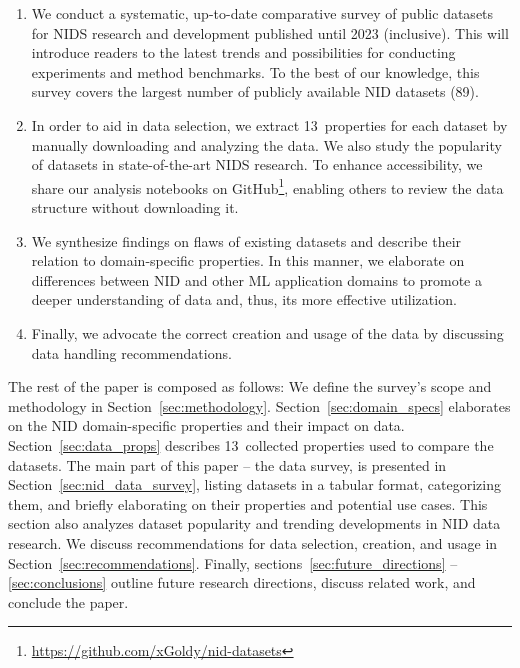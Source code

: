 \begin{enumerate}[itemsep=5pt, parsep=0pt]
    \item We conduct a systematic, up-to-date comparative survey of public datasets for NIDS research and development published until 2023 (inclusive). This will introduce readers to the latest trends and possibilities for conducting experiments and method benchmarks. To the best of our knowledge, this survey covers the largest number of publicly available NID datasets (89).

    \item In order to aid in data selection, we extract 13~properties for each dataset by manually downloading and analyzing the data. We also study the popularity of datasets in state-of-the-art NIDS research. To enhance accessibility, we share our analysis notebooks on GitHub\footnote{\url{https://github.com/xGoldy/nid-datasets}}, enabling others to review the data structure without downloading it.

    \item We synthesize findings on flaws of existing datasets and describe their relation to domain-specific properties. In this manner, we elaborate on differences between NID and other ML application domains to promote a deeper understanding of data and, thus, its more effective utilization.

    \item Finally, we advocate the correct creation and usage of the data by discussing data handling recommendations.
\end{enumerate}

The rest of the paper is composed as follows: We define the survey's scope and methodology in Section~\ref{sec:methodology}. Section~\ref{sec:domain_specs} elaborates on the NID domain-specific properties and their impact on data. Section~\ref{sec:data_props} describes 13~collected properties used to compare the datasets. The main part of this paper -- the data survey, is presented in Section~\ref{sec:nid_data_survey}, listing datasets in a tabular format, categorizing them, and briefly elaborating on their properties and potential use cases. This section also analyzes dataset popularity and trending developments in NID data research. We discuss recommendations for data selection, creation, and usage in Section~\ref{sec:recommendations}. Finally, sections~\ref{sec:future_directions} -- \ref{sec:conclusions} outline future research directions, discuss related work, and conclude the paper.

